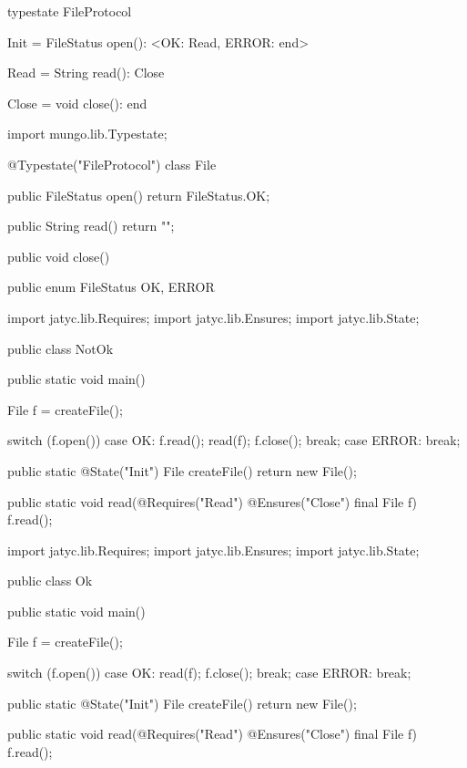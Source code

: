 \begin{code}
typestate FileProtocol {

  Init = {
    FileStatus open(): <OK: Read, ERROR: end>
  }

  Read = {
    String read(): Close
  }

  Close = {
    void close(): end
  }

}\end{code}

\begin{code}
import mungo.lib.Typestate;

@Typestate("FileProtocol")
class File {

  public FileStatus open() {
    return FileStatus.OK;
  }

  public String read() {
    return "";
  }

  public void close() {
  }

}\end{code}

\begin{code}
public enum FileStatus {
  OK, ERROR
}\end{code}

\begin{code}
import jatyc.lib.Requires;
import jatyc.lib.Ensures;
import jatyc.lib.State;

public class NotOk {

  public static void main() {
    File f = createFile();

    switch (f.open()) {
      case OK:
        f.read();
        read(f);
        f.close();
        break;
      case ERROR:
        break;
    }
  }

  public static @State("Init") File createFile() {
    return new File();
  }

  public static void read(@Requires("Read") @Ensures("Close") final File f) {
    f.read();
  }

}\end{code}

\begin{code}
import jatyc.lib.Requires;
import jatyc.lib.Ensures;
import jatyc.lib.State;

public class Ok {

  public static void main() {
    File f = createFile();

    switch (f.open()) {
      case OK:
        read(f);
        f.close();
        break;
      case ERROR:
        break;
    }
  }

  public static @State("Init") File createFile() {
    return new File();
  }

  public static void read(@Requires("Read") @Ensures("Close") final File f) {
    f.read();
  }

}\end{code}

